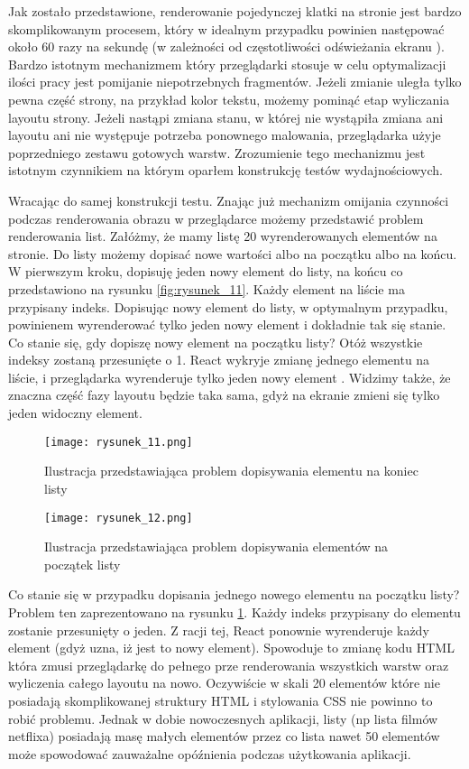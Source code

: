 Jak zostało przedstawione, renderowanie pojedynczej klatki na stronie jest bardzo skomplikowanym procesem, który w idealnym przypadku powinien następować około 60 razy na sekundę (w zależności od  częstotliwości odświeżania ekranu ).
Bardzo istotnym mechanizmem który przeglądarki stosuje w celu optymalizacji ilości pracy jest pomijanie niepotrzebnych fragmentów.
Jeżeli zmianie uległa tylko pewna część strony, na przykład kolor tekstu, możemy pominąć etap wyliczania layoutu strony.
Jeżeli nastąpi zmiana stanu, w której nie wystąpiła zmiana ani layoutu ani nie występuje potrzeba ponownego malowania, przeglądarka użyje poprzedniego zestawu gotowych warstw.
Zrozumienie tego mechanizmu jest istotnym czynnikiem na którym oparłem konstrukcję testów wydajnościowych.

Wracając do samej konstrukcji testu. Znając już mechanizm omijania czynności podczas renderowania obrazu w przeglądarce możemy przedstawić problem renderowania list.
Załóżmy, że mamy listę 20 wyrenderowanych elementów na stronie. Do listy możemy dopisać nowe wartości albo na początku albo na końcu.
W pierwszym kroku, dopisuję jeden nowy element do listy, na końcu co przedstawiono na rysunku \ref{fig:rysunek_11}. Każdy element na liście ma przypisany indeks.
Dopisując nowy element do listy, w optymalnym przypadku, powinienem wyrenderować tylko jeden nowy element i dokładnie tak się stanie. Co stanie się, gdy dopiszę nowy element na początku listy? Otóż wszystkie indeksy zostaną przesunięte o 1.
React wykryje zmianę jednego elementu na liście, i przeglądarka wyrenderuje tylko jeden nowy element . Widzimy także, że znaczna część fazy layoutu będzie taka sama, gdyż na ekranie zmieni się tylko jeden widoczny element.

\begin{figure}[]
    \centering
    \texttt{[image: rysunek\_11.png]}
    \caption{Ilustracja przedstawiająca problem dopisywania elementu na koniec listy}
    \label{fig:rysunek_11}
    \vspace*{\floatsep}
    \texttt{[image: rysunek\_12.png]}
    \caption{Ilustracja przedstawiająca problem dopisywania elementów na początek listy}
    \label{fig:rysunek_12}
\end{figure}

Co stanie się w przypadku dopisania jednego nowego elementu na początku listy? Problem ten zaprezentowano na rysunku \ref{fig:rysunek_12}. Każdy indeks przypisany do elementu zostanie przesunięty o jeden.
Z racji tej, React ponownie wyrenderuje każdy element (gdyż uzna, iż jest to nowy element). Spowoduje to zmianę kodu HTML która zmusi przeglądarkę do pełnego prze renderowania wszystkich warstw oraz wyliczenia całego layoutu na nowo.
Oczywiście w skali 20 elementów które nie posiadają skomplikowanej struktury HTML i stylowania CSS nie powinno to robić problemu.
Jednak w dobie nowoczesnych aplikacji, listy (np lista filmów netflixa) posiadają masę małych elementów przez co lista nawet 50 elementów może spowodować zauważalne opóźnienia podczas użytkowania aplikacji.


